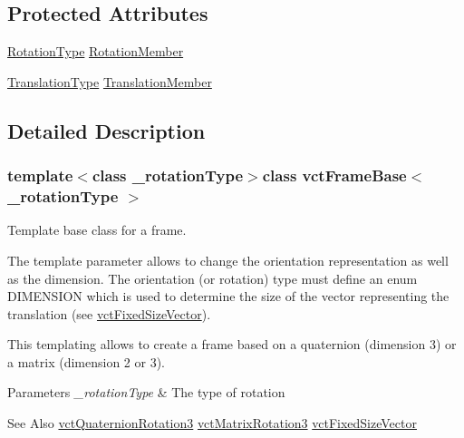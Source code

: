 \subsection*{Protected Attributes}
\begin{DoxyCompactItemize}
\item 
\hyperlink{classvct_frame_base_a02e4eaad478400dd1d81e772caf3b01b}{Rotation\-Type} \hyperlink{classvct_frame_base_a686087937bca6d58cbfaf251736915b4}{Rotation\-Member}
\item 
\hyperlink{classvct_frame_base_a4c397a93b65f0c38e75e99ff3a659c23}{Translation\-Type} \hyperlink{classvct_frame_base_a982d51cac7f38f898989db9f8ad3ff84}{Translation\-Member}
\end{DoxyCompactItemize}


\subsection{Detailed Description}
\subsubsection*{template$<$class \-\_\-rotation\-Type$>$class vct\-Frame\-Base$<$ \-\_\-rotation\-Type $>$}

Template base class for a frame. 

The template parameter allows to change the orientation representation as well as the dimension. The orientation (or rotation) type must define an enum D\-I\-M\-E\-N\-S\-I\-O\-N which is used to determine the size of the vector representing the translation (see \hyperlink{classvct_fixed_size_vector}{vct\-Fixed\-Size\-Vector}).

This templating allows to create a frame based on a quaternion (dimension 3) or a matrix (dimension 2 or 3).


\begin{DoxyParams}{Parameters}
{\em \-\_\-rotation\-Type} & The type of rotation\\
\hline
\end{DoxyParams}
\begin{DoxySeeAlso}{See Also}
\hyperlink{classvct_quaternion_rotation3}{vct\-Quaternion\-Rotation3} \hyperlink{classvct_matrix_rotation3}{vct\-Matrix\-Rotation3} \hyperlink{classvct_fixed_size_vector}{vct\-Fixed\-Size\-Vector} 
\end{DoxySeeAlso}


